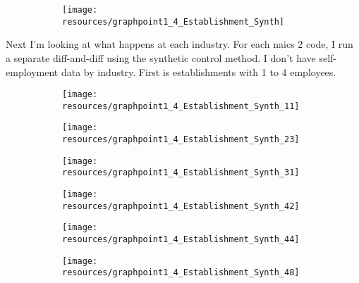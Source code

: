 \documentclass[12pt]{article}
\begin{document}
\begin{figure}[H]
	\centering
	\begin{subfigure}[b]{0.4\textwidth}
	    \texttt{[image: resources/graphpoint1\_4\_Establishment\_Synth]}
	\end{subfigure}
\end{figure}

\pagebreak

Next I'm looking at what happens at each industry. For each naics 2 code, I run a separate diff-and-diff using the synthetic control method. I don't have self-employment data by industry. First is establishments with 1 to 4 employees. 

\begin{center}
	\centering
	
\end{center}

\begin{figure}[H]
	\centering
	\begin{subfigure}[b]{0.4\textwidth}
	    \texttt{[image: resources/graphpoint1\_4\_Establishment\_Synth\_11]}
	\end{subfigure}
	\begin{subfigure}[b]{0.4\textwidth}
		  \texttt{[image: resources/graphpoint1\_4\_Establishment\_Synth\_23]}
	\end{subfigure}
\end{figure}

\begin{figure}[H]
	\centering
	\begin{subfigure}[b]{0.4\textwidth}
	    \texttt{[image: resources/graphpoint1\_4\_Establishment\_Synth\_31]}
	\end{subfigure}
	\begin{subfigure}[b]{0.4\textwidth}
		  \texttt{[image: resources/graphpoint1\_4\_Establishment\_Synth\_42]}
	\end{subfigure}
\end{figure}

\begin{figure}[H]
	\centering
	\begin{subfigure}[b]{0.4\textwidth}
	    \texttt{[image: resources/graphpoint1\_4\_Establishment\_Synth\_44]}
	\end{subfigure}
	\begin{subfigure}[b]{0.4\textwidth}
		  \texttt{[image: resources/graphpoint1\_4\_Establishment\_Synth\_48]}
	\end{subfigure}
\end{figure}
\end{document}
